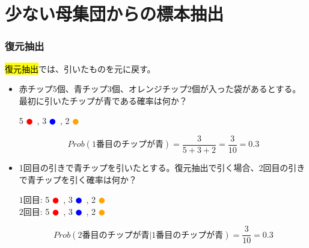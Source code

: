 
\section{少ない母集団からの標本抽出}


\begin{frame}[shrink=10]
\frametitle{復元抽出}

\hl{復元抽出}では、引いたものを元に戻す。

\begin{itemize}

\item 赤チップ5個、青チップ3個、オレンジチップ2個が入った袋があるとする。最初に引いたチップが青である確率は何か？
\begin{center}
5 \textcolor{red}{$\CIRCLE$}~, 3 \textcolor{blue}{$\CIRCLE$}~, 2 \textcolor{orange}{$\CIRCLE$}
\end{center}

\[ Prob(1\text{番目のチップが青}) = \frac{3}{5 + 3 + 2} = \frac{3}{10} = 0.3 \]

\item 1回目の引きで青チップを引いたとする。復元抽出で引く場合、2回目の引きで青チップを引く確率は何か？

\begin{center}
$1\text{回目}$: 5 \textcolor{red}{$\CIRCLE$}~, 3 \textcolor{blue}{$\CIRCLE$}~, 2 \textcolor{orange}{$\CIRCLE$} \\

$2\text{回目}$: 5 \textcolor{red}{$\CIRCLE$}~, 3 \textcolor{blue}{$\CIRCLE$}~, 2 \textcolor{orange}{$\CIRCLE$}
\end{center}

\[ Prob(2\text{番目のチップが青} | 1\text{番目のチップが青}) = \frac{3}{10} = 0.3 \]

\end{itemize}

\end{frame}


